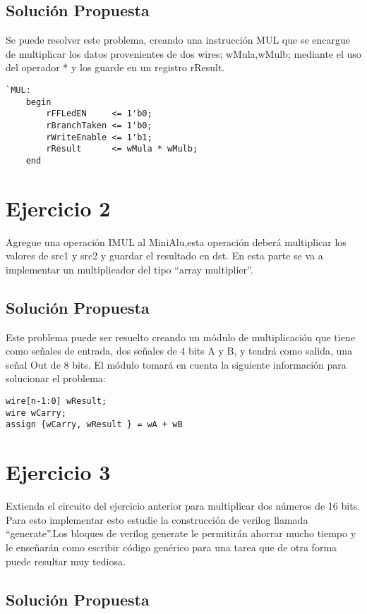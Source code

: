 \documentclass[10pt]{article}
\begin{document}
\subsection*{Solución Propuesta}
Se puede resolver este problema, creando una instrucción MUL que se encargue de multiplicar los datos provenientes de dos wires; wMula,wMulb; mediante el uso del operador * y los guarde en un registro rResult.
\begin{lstlisting}
`MUL:
	begin
		rFFLedEN     <= 1'b0;
		rBranchTaken <= 1'b0;
		rWriteEnable <= 1'b1;
		rResult      <= wMula * wMulb;
	end
\end{lstlisting}

\newpage
\section*{Ejercicio 2}
Agregue una operación IMUL al MiniAlu,esta operación deberá multiplicar los valores de
src1 y src2 y guardar el resultado en dst.
En esta parte se va a  implementar un multiplicador del tipo “array multiplier”.

\subsection*{Solución Propuesta}
Este problema puede ser resuelto creando un módulo de multiplicación que tiene como señales de entrada, dos señales de 4 bits A y B, y tendrá como salida, una señal Out de 8 bits.
El módulo tomará en cuenta la siguiente información para solucionar el problema:

\begin{lstlisting}
wire[n-1:0] wResult;
wire wCarry;     
assign {wCarry, wResult } = wA + wB
\end{lstlisting}

\newpage
\section*{Ejercicio 3}
Extienda el circuito del ejercicio anterior para multiplicar dos números de 16 bits. 
Para esto implementar esto estudie la construcción de verilog llamada “generate”.Los bloques de verilog generate le permitirán ahorrar mucho tiempo y le 
enseñarán como escribir código genérico para una tarea que de otra forma puede resultar muy tediosa.

\subsection*{Solución Propuesta}
\end{document}

